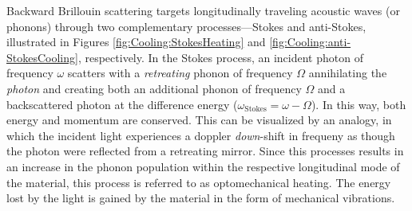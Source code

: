 Backward Brillouin scattering targets longitudinally traveling acoustic waves (or phonons) through two complementary processes---Stokes and anti-Stokes, illustrated in Figures \ref{fig:Cooling:StokesHeating} and \ref{fig:Cooling:anti-StokesCooling}, respectively. In the Stokes process, an incident photon of frequency \(\omega\) scatters with a \textit{retreating} phonon of frequency \(\Omega\) annihilating the \textit{photon} and creating both an additional phonon of frequency \(\Omega\) and a backscattered photon at the difference energy (\(\omega_{\mathrm{Stokes}} = \omega - \Omega\)). In this way, both energy and momentum are conserved. This can be visualized by an analogy, in which the incident light experiences a doppler \textit{down}-shift in frequeny as though the photon were reflected from a retreating mirror. Since this processes results in an increase in the phonon population within the respective longitudinal mode of the material, this process is referred to as optomechanical heating. The energy lost by the light is gained by the material in the form of mechanical vibrations.

